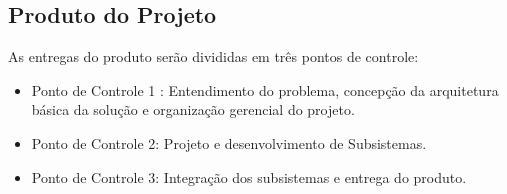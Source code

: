 		\subsection[Produto do Projeto]{Produto do Projeto}
			As entregas do produto serão divididas em três pontos de controle:
			\begin{itemize}
				\item Ponto de Controle 1 : Entendimento do problema,  concepção da arquitetura básica da solução e organização gerencial do projeto.
				\item Ponto de Controle 2: Projeto e desenvolvimento de Subsistemas.
				\item Ponto de Controle 3: Integração dos subsistemas e entrega do produto.
			\end{itemize}

